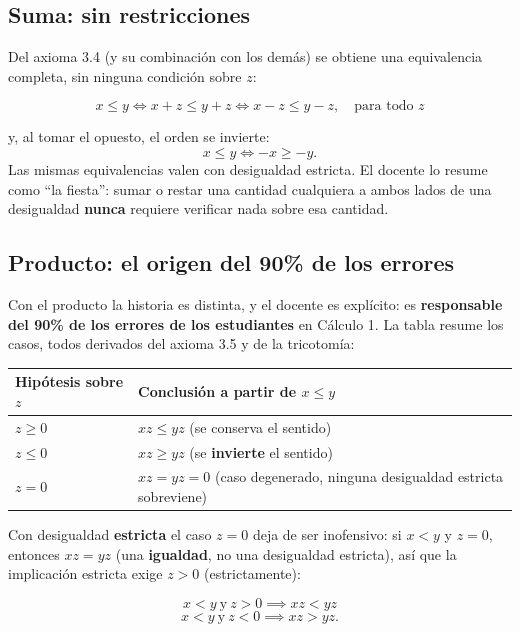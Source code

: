 \documentclass[12pt,a4paper]{article}
\begin{document}
\subsection{Suma: sin restricciones}

Del axioma 3.4 (y su combinación con los demás) se obtiene una equivalencia
completa, sin ninguna condición sobre $z$:

\begin{keybox}
\[
\boxed{x\le y \iff x+z \le y+z \iff x-z \le y-z, \quad \text{para todo } z}
\]
\end{keybox}

y, al tomar el opuesto, el orden se invierte:
\[
x\le y \iff -x \ge -y.
\]
Las mismas equivalencias valen con desigualdad estricta. El docente lo
resume como ``la fiesta'': sumar o restar una cantidad cualquiera a ambos
lados de una desigualdad \textbf{nunca} requiere verificar nada sobre esa
cantidad.

\subsection{Producto: el origen del 90\% de los errores}

Con el producto la historia es distinta, y el docente es explícito: es
\textbf{responsable del 90\% de los errores de los estudiantes} en
Cálculo 1. La tabla resume los casos, todos derivados del axioma 3.5 y de
la tricotomía:

\begin{table}[H]
\centering
\begin{tabular}{@{}lp{8cm}@{}}
\toprule
Hipótesis sobre $z$ & Conclusión a partir de $x\le y$ \\
\midrule
$z \ge 0$ & $xz \le yz$ (se conserva el sentido) \\
$z \le 0$ & $xz \ge yz$ (se \textbf{invierte} el sentido) \\
$z = 0$ & $xz = yz = 0$ (caso degenerado, ninguna desigualdad estricta sobreviene) \\
\bottomrule
\end{tabular}
\end{table}

Con desigualdad \textbf{estricta} el caso $z=0$ deja de ser inofensivo: si
$x<y$ y $z=0$, entonces $xz=yz$ (una \textbf{igualdad}, no una desigualdad
estricta), así que la implicación estricta exige $z>0$ (estrictamente):

\begin{keybox}
\[
\boxed{x<y \ \text{y} \ z>0 \implies xz<yz}
\]
\[
x<y \ \text{y} \ z<0 \implies xz>yz.
\]
\end{keybox}
\end{document}
